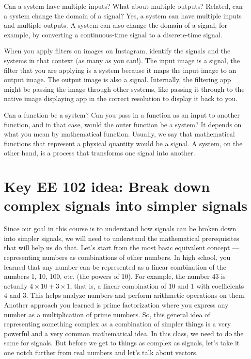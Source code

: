 \begin{popquiz}
Can a system have multiple inputs? What about multiple outputs? Related, can a system change the domain of a signal? 
\popqsplit
Yes, a system can have multiple inputs and multiple outputs. A system can also change the domain of a signal, for example, by converting a continuous-time signal to a discrete-time signal.
\end{popquiz}
\begin{popquiz}
When you apply filters on images on Instagram, identify the signals and the systems in that context (as many as you can!).
\popqsplit
The input image is a signal, the filter that you are applying is a system because it maps the input image to an output image. The output image is also a signal. Internally, the filtering app might be passing the image through other systems, like passing it through to the native image displaying app in the correct resolution to display it back to you. 
\end{popquiz}

\begin{popquiz}
Can a function be a system? Can you pass in a function as an input to another function, and in that case, would the outer function be a system?
\popqsplit 
It depends on what you mean by mathematical function. Usually, we say that mathematical functions that represent a physical quantity would be a signal. A system, on the other hand, is a process that transforms one signal into another.
\end{popquiz}

\section{Key EE 102 idea: Break down complex signals into simpler signals}
Since our goal in this course is to understand how signals can be broken down into simpler signals, we will need to understand the mathematical prerequisites that will help us do that. Let's start from the most basic equivalent concept --- representing numbers as combinations of other numbers. In high school, you learned that any number can be represented as a linear combination of the numbers 1, 10, 100, etc. (the powers of 10). For example, the number 43 is actually $4 \times 10 + 3 \times 1$, that is, a linear combination of 10 and 1 with coefficients 4 and 3. This helps analyze numbers and perform arithmetic operations on them. Another approach you learned is prime factorization where you express any number as a multiplication of prime numbers. So, this general idea of representing something complex as a combination of simpler things is a very powerful and a very common mathematical idea. In this class, we need to do the same for signals. But before we get to things as complex as signals, let's take it one notch further from real numbers and let's talk about vectors.

